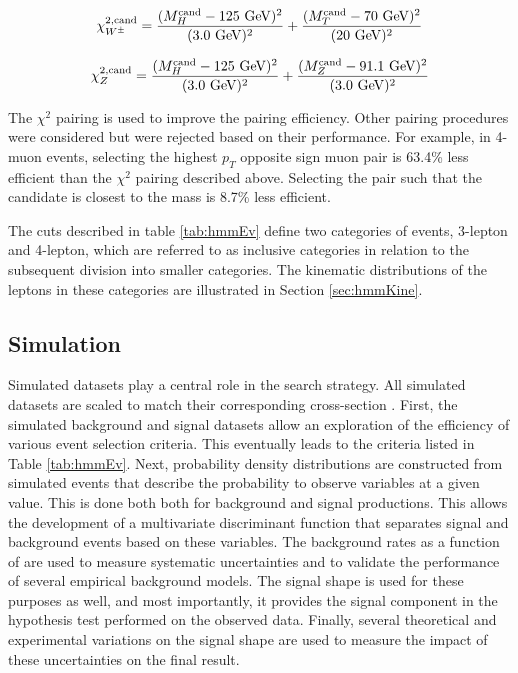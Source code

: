 \begin{equation}
  \label{eq:hmmWhPairing}
  \chi^{2,\text{cand}}_{W^\pm} = \frac{(M_H^\text{cand}-125\text{ GeV})^2}{(3.0\text{ GeV})^2} + \frac{(M_T^\text{cand}-70\text{ GeV} )^2}{(20\text{ GeV})^2}
\end{equation}

\begin{equation}
  \label{eq:hmmZhPairing}
  \chi^{2,\text{cand}}_{Z} = \frac{(M_H^\text{cand}-125\text{ GeV})^2}{(3.0\text{ GeV})^2} + \frac{(M_Z^\text{cand}-91.1\text{ GeV} )^2}{(3.0\text{ GeV})^2}
\end{equation}

The $\chi^2$ pairing is used to improve the pairing efficiency.
Other pairing procedures were considered but were rejected based on their performance.
For example, in 4-muon events, selecting the highest $p_T$ opposite sign muon pair is 63.4\% less efficient than the $\chi^2$ pairing described above. 
Selecting the pair such that the \Z candidate is closest to the \Z mass is 8.7\% less efficient.

The cuts described in table \ref{tab:hmmEv} define two categories of events, 3-lepton and 4-lepton, which are referred to as inclusive categories in relation to the subsequent division into smaller categories.
The kinematic distributions of the leptons in these categories are illustrated in Section \ref{sec:hmmKine}.

\subsection{Simulation}\label{sec:hmmSim}

Simulated datasets play a central role in the search strategy.
All simulated datasets are scaled to match their corresponding cross-section \cite{higgsCross}.
First, the simulated background and signal datasets allow an exploration of the efficiency of various event selection criteria.
This eventually leads to the criteria listed in Table \ref{tab:hmmEv}.
Next, probability density distributions are constructed from simulated events that describe the probability to observe variables at a given value.
This is done both both for background and signal productions.
This allows the development of a multivariate discriminant function that separates signal and background events based on these variables.
The background rates as a function of \muu are used to measure systematic uncertainties and to validate the performance of several empirical background models.
The signal shape is used for these purposes as well, and most importantly, it provides the signal component in the hypothesis test performed on the observed data.
Finally, several theoretical and experimental variations on the signal shape are used to measure the impact of these uncertainties on the final result.

